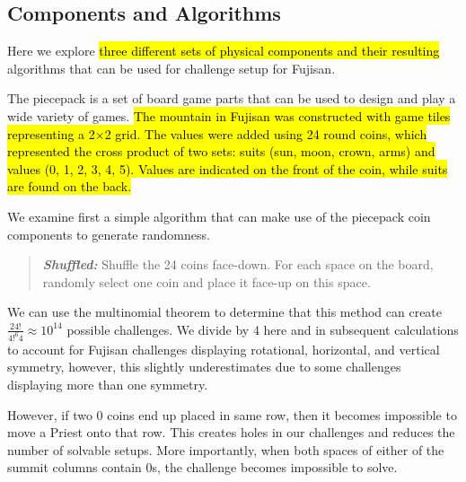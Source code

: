 \documentclass[journal]{IEEEtran}
\begin{document}


\subsection{Components and Algorithms}
\label{section:pcgalgs}
\noindent
Here we explore \hl{three different sets of physical components and their resulting} algorithms that can be used for challenge setup for Fujisan. 

The piecepack is a set of board game parts that can be used to design and play a wide variety of games\cite{GAMESYSTEM}. \hl{The mountain in Fujisan was constructed with game tiles representing a 2$\times$2 grid. The values were added using 24 round coins, which represented the cross product of two sets: suits (sun, moon, crown, arms) and values (0, 1, 2, 3, 4, 5). Values are indicated on the front of the coin, while suits are found on the back.}

We examine first a simple algorithm that can make use of the piecepack coin components to generate randomness. 

\begin{quote}
    
  {\it \bf Shuffled:} Shuffle the 24 coins face-down. For each space on the board, randomly select one coin and place it face-up on this space.
  
\end{quote}

We can use the multinomial theorem to determine that this method can create
$\frac{24!}{4!^{6}4} \approx 10^{14}$ possible challenges.  We divide by 4 here and in subsequent calculations to account for Fujisan challenges displaying rotational, horizontal, and vertical symmetry, however, this slightly underestimates due to some challenges displaying more than one symmetry.

However, if two 0 coins end up placed in same row, then it becomes impossible to move a Priest onto that row. This creates holes in our challenges and reduces the number of solvable setups. 
More importantly, when both spaces of either of the summit columns contain 0s, the challenge becomes impossible to solve.
\end{document}

